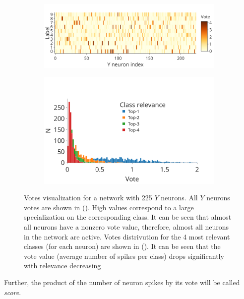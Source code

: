 \documentclass[a4paper,10pt]{article}
\begin{document}
\begin{figure}[H]
\centering
\begin{subfigure}{0.7\textwidth}
    \includegraphics[width=\textwidth,keepaspectratio=true]{votes.pdf}
    \caption{}
    \label{fig:votes:votes}
\end{subfigure}
\begin{subfigure}{0.7\textwidth} 
    \includegraphics[width=\textwidth,keepaspectratio=true]{votes_distr_4.pdf} 
    \caption{}
    \label{fig:votes:distr}
\end{subfigure}
\caption{Votes visualization for a network with 225 $Y$ neurons. All $Y$ neurons votes are shown in (). High values correspond to a large specialization on the corresponding class. It can be seen that almost all neurons have a nonzero vote value, therefore, almost all neurons in the network are active. Votes distrivution for the 4 most relevant classes (for each neuron) are shown in (). It can be seen that the vote value (average number of spikes per class) drops significantly with relevance decreasing}
\label{fig:votes}
\end{figure}

Further, the product of the number of neuron spikes by its vote will be called \textit{score}.
\end{document}
